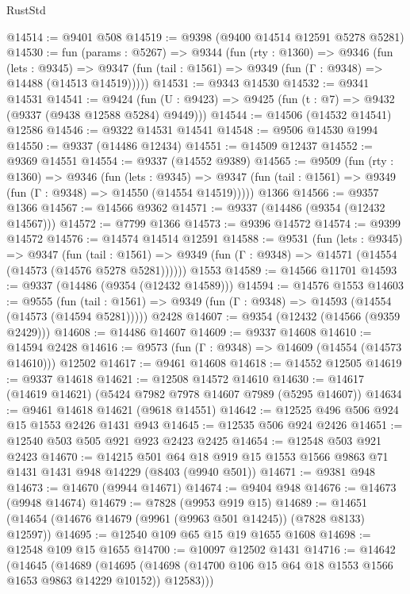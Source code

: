 \begin{lexlean}{RustStd}
\begin{coremodule}
@14514 := @9401 @508
@14519 := @9398 (@9400 @14514 @12591 @5278 @5281)
@14530 := fun (params : @5267) =>
  @9344
    (fun (rty : @1360) =>
    @9346
      (fun (lets : @9345) =>
      @9347 (fun (tail : @1561) => @9349 (fun (Γ : @9348) => @14488 (@14513 @14519)))))
@14531 := @9343 @14530
@14532 := @9341 @14531
@14541 := @9424
    (fun (U : @9423) => @9425 (fun (t : @7) => @9432 (@9337 (@9438 @12588 @5284) @9449)))
@14544 := @14506 (@14532 @14541) @12586
@14546 := @9322 @14531 @14541
@14548 := @9506 @14530 @1994
@14550 := @9337 (@14486 @12434)
@14551 := @14509 @12437
@14552 := @9369 @14551
@14554 := @9337 (@14552 @9389)
@14565 := @9509
    (fun (rty : @1360) =>
    @9346
      (fun (lets : @9345) =>
      @9347 (fun (tail : @1561) => @9349 (fun (Γ : @9348) => @14550 (@14554 @14519)))))
    @1366
@14566 := @9357 @1366
@14567 := @14566 @9362
@14571 := @9337 (@14486 (@9354 (@12432 @14567)))
@14572 := @7799 @1366
@14573 := @9396 @14572
@14574 := @9399 @14572
@14576 := @14574 @14514 @12591
@14588 := @9531
    (fun (lets : @9345) =>
    @9347
      (fun (tail : @1561) =>
      @9349 (fun (Γ : @9348) => @14571 (@14554 (@14573 (@14576 @5278 @5281))))))
    @1553
@14589 := @14566 @11701
@14593 := @9337 (@14486 (@9354 (@12432 @14589)))
@14594 := @14576 @1553
@14603 := @9555
    (fun (tail : @1561) => @9349 (fun (Γ : @9348) => @14593 (@14554 (@14573 (@14594 @5281)))))
    @2428
@14607 := @9354 (@12432 (@14566 (@9359 @2429)))
@14608 := @14486 @14607
@14609 := @9337 @14608
@14610 := @14594 @2428
@14616 := @9573 (fun (Γ : @9348) => @14609 (@14554 (@14573 @14610))) @12502
@14617 := @9461 @14608
@14618 := @14552 @12505
@14619 := @9337 @14618
@14621 := @12508 @14572 @14610
@14630 := @14617 (@14619 @14621) (@5424 @7982 @7978 @14607 @7989 (@5295 @14607))
@14634 := @9461 @14618 @14621 (@9618 @14551)
@14642 := @12525 @496 @506 @924 @15 @1553 @2426 @1431 @943
@14645 := @12535 @506 @924 @2426
@14651 := @12540 @503 @505 @921 @923 @2423 @2425
@14654 := @12548 @503 @921 @2423
@14670 := @14215
    @501
    @64
    @18
    @919
    @15
    @1553
    @1566
    @9863
    @71
    @1431
    @1431
    @948
    @14229
    (@8403 (@9940 @501))
@14671 := @9381 @948
@14673 := @14670 (@9944 @14671)
@14674 := @9404 @948
@14676 := @14673 (@9948 @14674)
@14679 := @7828 (@9953 @919 @15)
@14689 := @14651 (@14654 (@14676 @14679 (@9961 (@9963 @501 @14245)) (@7828 @8133) @12597))
@14695 := @12540 @109 @65 @15 @19 @1655 @1608
@14698 := @12548 @109 @15 @1655
@14700 := @10097 @12502 @1431
@14716 := @14642
    (@14645
      (@14689
        (@14695 (@14698 (@14700 @106 @15 @64 @18 @1553 @1566 @1653 @9863 @14229 @10152)) @12583)))

\end{coremodule}
\end{lexlean}
